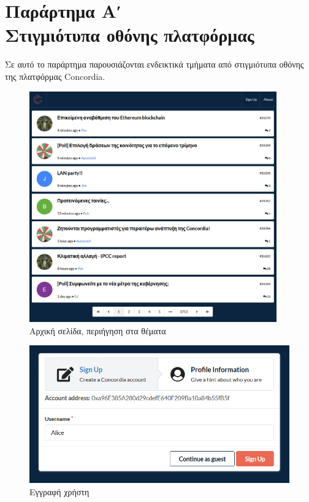 \chapter*{Παράρτημα Αʹ\\[20pt]Στιγμιότυπα οθόνης πλατφόρμας}\label{appendix-a}


\captionsetup{labelformat=AppendixAFigures}
\setcounter{figure}{0}

Σε αυτό το παράρτημα παρουσιάζονται ενδεικτικά τμήματα από στιγμιότυπα οθόνης της πλατφόρμας Concordia.

\begin{figure}[H]
	\centering
	\includegraphics[width=0.95\textwidth]{assets/figures/appendix-a/screenshot-1-topics-screen}
	\caption{Αρχική σελίδα, περιήγηση στα θέματα}
\end{figure}

\begin{figure}[H]
	\centering
	\includegraphics[width=\textwidth]{assets/figures/appendix-a/screenshot-2-signup}
	\caption{Εγγραφή χρήστη}
\end{figure}

